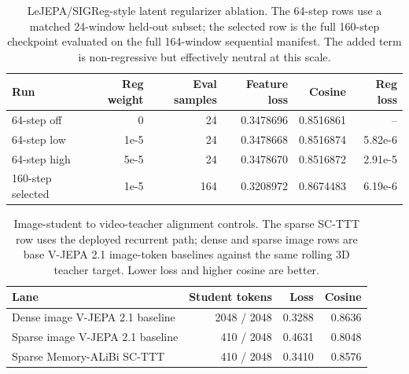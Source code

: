\documentclass[10pt]{article}
\begin{document}
\begin{table}[t]
\centering
\scriptsize
\setlength{\tabcolsep}{3pt}
\caption{LeJEPA/SIGReg-style latent regularizer ablation.  The 64-step rows use
a matched 24-window held-out subset; the selected row is the full 160-step
checkpoint evaluated on the full 164-window sequential manifest.  The added
term is non-regressive but effectively neutral at this scale.}
\label{tab:sigreg}
\begin{tabular}{lrrrrr}
\toprule
Run & Reg weight & Eval samples & Feature loss & Cosine & Reg loss \\
\midrule
64-step off & 0 & 24 & 0.3478696 & 0.8516861 & -- \\
64-step low & 1e-5 & 24 & 0.3478668 & 0.8516874 & 5.82e-6 \\
64-step high & 5e-5 & 24 & 0.3478670 & 0.8516872 & 2.91e-5 \\
160-step selected & 1e-5 & 164 & 0.3208972 & 0.8674483 & 6.19e-6 \\
\bottomrule
\end{tabular}
\end{table}

\begin{table}[t]
\centering
\scriptsize
\setlength{\tabcolsep}{3pt}
\caption{Image-student to video-teacher alignment controls.  The sparse
SC-TTT row uses the deployed recurrent path; dense and sparse image rows are
base V-JEPA 2.1 image-token baselines against the same rolling 3D teacher
target.  Lower loss and higher cosine are better.}
\label{tab:image-video-alignment}
\begin{tabular}{lrrr}
\toprule
Lane & Student tokens & Loss & Cosine \\
\midrule
Dense image V-JEPA 2.1 baseline & 2048 / 2048 & 0.3288 & 0.8636 \\
Sparse image V-JEPA 2.1 baseline & 410 / 2048 & 0.4631 & 0.8048 \\
Sparse Memory-ALiBi SC-TTT & 410 / 2048 & 0.3410 & 0.8576 \\
\bottomrule
\end{tabular}
\end{table}
\end{document}
